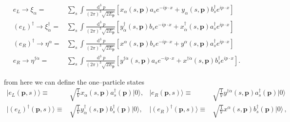 \begin{frame}
\begin{align}
\label{eq:fourweyl}
 e_L\to \xi_{\alpha}=&\sum_s\int \frac{\operatorname{d}^3p}{(2\pi)^3\sqrt{2E_{\mathbf{p}}}} \left[ x_{\alpha}\left(s,\mathbf{p}\right) a_s e^{-i p\cdot x}+y_{\alpha}\left(s,\mathbf{p}\right) b_s^{\dagger} e^{i p\cdot x}  \right]\nonumber\\
 \left( e_L \right)^{\dagger}\to \xi_{\dot{\alpha}}^{\dagger}=&\sum_s\int \frac{\operatorname{d}^3p}{(2\pi)^3\sqrt{2E_{\mathbf{p}}}} \left[ y_{\dot{\alpha}}^{\dagger}\left(s,\mathbf{p}\right) b_s e^{-i p\cdot x}+x_{\dot{\alpha}}^{\dagger}\left(s,\mathbf{p}\right) a_s^{\dagger} e^{i p\cdot x}  \right]\nonumber\\
 \left( e_R \right)^{\dagger}\to \eta^{\alpha}=&\sum_s\int \frac{\operatorname{d}^3p}{(2\pi)^3\sqrt{2E_{\mathbf{p}}}} \left[ x^{\alpha}\left(s,\mathbf{p}\right) b_s e^{-i p\cdot x}+y^{\alpha}\left(s,\mathbf{p}\right) a_s^{\dagger} e^{i p\cdot x}  \right] \nonumber\\
  e_R\to \eta^{\dagger\dot{\alpha}}=&\sum_s\int \frac{\operatorname{d}^3p}{(2\pi)^3\sqrt{2E_{\mathbf{p}}}} \left[ y^{\dagger\dot{\alpha}}\left(s,\mathbf{p}\right) a_s e^{-i p\cdot x}+x^{\dagger\dot{\alpha}}\left(s,\mathbf{p}\right) b_s^{\dagger} e^{i p\cdot x}  \right].
\end{align}
\end{frame}

\begin{frame}
from here we can define the one--particle states  
\begin{align}
  \label{eq:77f}
   | e_L(\mathbf{p},s)\rangle\equiv&\sqrt{\frac{1}{V}}x_{\alpha}\left(s,\mathbf{p}\right) a^\dagger_s(\mathbf{p})|0\rangle, &    | e_R(\mathbf{p},s)\rangle\equiv&\sqrt{\frac{1}{V}}y^{\dagger\dot{\alpha}}\left(s,\mathbf{p}\right)a^\dagger_s(\mathbf{p})|0\rangle\nonumber\\
   | \left( e_L \right)^{\dagger}(\mathbf{p},s)\rangle\equiv&\sqrt{\frac{1}{V}}y_{\dot{\alpha}}^{\dagger}\left(s,\mathbf{p}\right){b}^\dagger_s(\mathbf{p})|0\rangle,&
   | \left( e_R \right)^{\dagger}(\mathbf{p},s)\rangle\equiv&\sqrt{\frac{1}{V}}x^{\alpha}\left(s,\mathbf{p}\right){b}^\dagger_s(\mathbf{p})|0\rangle\,, 
\end{align}
\end{frame}

